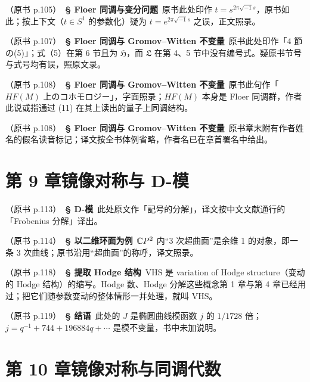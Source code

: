 \noindent （原书 p.105）\ \textbf{§ Floer 同调与变分问题}\ 原书此处印作 $t=s^{2\pi\sqrt{-1}s}$，原书如此；按上下文（$t\in S^{1}$ 的参数化）疑为 $t=e^{2\pi\sqrt{-1}s}$ 之误，正文照录。\par\smallskip

\noindent （原书 p.107）\ \textbf{§ Floer 同调与 Gromov--Witten 不变量}\ 原书此处印作「4 節の(5)」；式（5）在第 6 节且为 $\mathfrak{H}$，而 $\mathfrak{L}$ 在第 4、5 节中没有编号式。疑原书节号与式号均有误，照原文录。\par\smallskip

\noindent （原书 p.108）\ \textbf{§ Floer 同调与 Gromov--Witten 不变量}\ 原书此句作「$HF(M)$ 上のコホモロジー」，字面照录；$HF(M)$ 本身是 Floer 同调群，作者此说或指通过 (11) 在其上读出的量子上同调结构。\par\smallskip

\noindent （原书 p.108）\ \textbf{§ Floer 同调与 Gromov--Witten 不变量}\ 原书章末附有作者姓名的假名读音标记；译文按全书体例省略，作者名已在章首署名中给出。\par\smallskip

\section*{第 9 章\quad 镜像对称与 D-模}

\noindent （原书 p.113）\ \textbf{§ D-模}\ 此处原文作「記号的分解」，译文按中文文献通行的「Frobenius 分解」译出。\par\smallskip

\noindent （原书 p.114）\ \textbf{§ 以二维环面为例}\ $\mathbb{C}P^2$ 内“3 次超曲面”是余维 1 的对象，即一条 3 次曲线；原书沿用“超曲面”的称呼，译文照录。\par\smallskip

\noindent （原书 p.118）\ \textbf{§ 提取 Hodge 结构}\ VHS 是 variation of Hodge structure（变动的 Hodge 结构）的缩写。Hodge 数、Hodge 分解这些概念第 1 章与第 4 章已经用过；把它们随参数变动的整体情形一并处理，就叫 VHS。\par\smallskip

\noindent （原书 p.119）\ \textbf{§ 结语}\ 此处的 $J$ 是椭圆曲线模函数 $j$ 的 $1/1728$ 倍；$j=q^{-1}+744+196884q+\cdots$ 是模不变量，书中未加说明。\par\smallskip

\section*{第 10 章\quad 镜像对称与同调代数}

